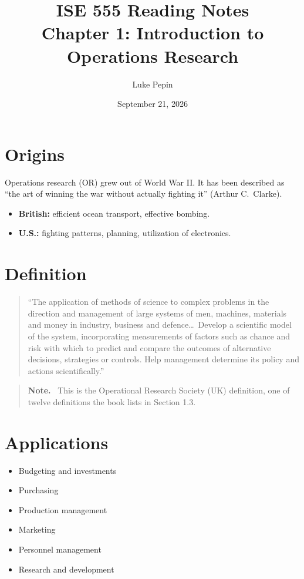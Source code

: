 \documentclass[11pt]{article}
\title{ISE 555 Reading Notes\\\large Chapter 1: Introduction to Operations Research}
\author{Luke Pepin}
\date{September 21, 2026}
\newenvironment{aside}{\begin{quote}\small\color{black!65}\textbf{Note.}\ }{\end{quote}}
\begin{document}
\maketitle

\section{Origins}

Operations research (OR) grew out of World War II. It has been described as
``the art of winning the war without actually fighting it'' (Arthur C.\ Clarke).
\begin{itemize}
    \item \textbf{British:} efficient ocean transport, effective bombing.
    \item \textbf{U.S.:} fighting patterns, planning, utilization of electronics.
\end{itemize}

\section{Definition}

\begin{quote}
``The application of methods of science to complex problems in the direction and
management of large systems of men, machines, materials and money in industry,
business and defence\ldots\ Develop a scientific model of the system, incorporating
measurements of factors such as chance and risk with which to predict and compare
the outcomes of alternative decisions, strategies or controls. Help management
determine its policy and actions scientifically.''
\end{quote}

\begin{aside}
This is the Operational Research Society (UK) definition, one of twelve definitions
the book lists in Section 1.3.
\end{aside}

\section{Applications}

\begin{itemize}
    \item Budgeting and investments
    \item Purchasing
    \item Production management
    \item Marketing
    \item Personnel management
    \item Research and development
\end{itemize}
\end{document}
